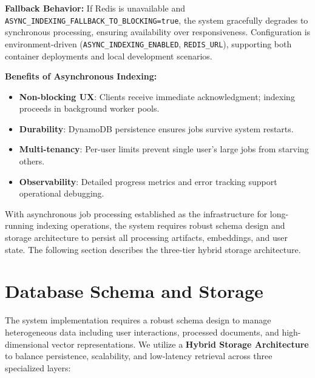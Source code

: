 \textbf{Fallback Behavior:} If Redis is unavailable and \texttt{ASYNC\_INDEXING\_FALLBACK\_TO\_BLOCKING=true}, the system gracefully degrades to synchronous processing, ensuring availability over responsiveness. Configuration is environment-driven (\texttt{ASYNC\_INDEXING\_ENABLED}, \texttt{REDIS\_URL}), supporting both container deployments and local development scenarios.

\textbf{Benefits of Asynchronous Indexing:}
\begin{itemize}
    \item \textbf{Non-blocking UX}: Clients receive immediate acknowledgment; indexing proceeds in background worker pools.
    \item \textbf{Durability}: DynamoDB persistence ensures jobs survive system restarts.
    \item \textbf{Multi-tenancy}: Per-user limits prevent single user's large jobs from starving others.
    \item \textbf{Observability}: Detailed progress metrics and error tracking support operational debugging.
\end{itemize}

With asynchronous job processing established as the infrastructure for long-running indexing operations, the system requires robust schema design and storage architecture to persist all processing artifacts, embeddings, and user state. The following section describes the three-tier hybrid storage architecture.


\section{Database Schema and Storage}
The system implementation requires a robust schema design to manage heterogeneous data including user interactions, processed documents, and high-dimensional vector representations. We utilize a \textbf{Hybrid Storage Architecture} to balance persistence, scalability, and low-latency retrieval across three specialized layers:

